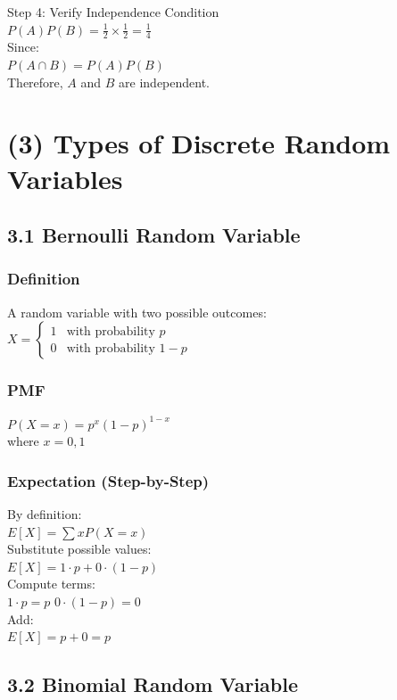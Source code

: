 \documentclass{article}
\begin{document}
Step 4: Verify Independence Condition \\
$P(A)P(B) = \frac{1}{2} \times \frac{1}{2} = \frac{1}{4}$ \\
Since: \\
$P(A \cap B) = P(A)P(B)$ \\
Therefore, $A$ and $B$ are independent.

\section{(3) Types of Discrete Random Variables}

\subsection{3.1 Bernoulli Random Variable}

\subsubsection{Definition}
A random variable with two possible outcomes: \\
$X = \begin{cases} 1 & \text{with probability } p \\ 0 & \text{with probability } 1-p \end{cases}$

\subsubsection{PMF}
$P(X=x) = p^x (1-p)^{1-x}$ \\
where $x=0,1$

\subsubsection{Expectation (Step-by-Step)}
By definition: \\
$E[X] = \sum xP(X=x)$ \\
Substitute possible values: \\
$E[X] = 1 \cdot p + 0 \cdot (1-p)$ \\
Compute terms: \\
$1 \cdot p = p$ \quad $0 \cdot (1-p) = 0$ \\
Add: \\
$E[X] = p + 0 = p$

\subsection{3.2 Binomial Random Variable}
\end{document}

